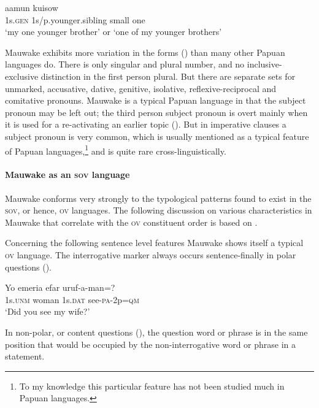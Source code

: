 \ea%
\label{ex:1:x660}
\gll {}  aamun    kuisow \\
 1s.\textsc{gen}  1s/p.younger.sibling  small  one     \\
\glt`my one younger brother' or `one of my younger brothers'
\z


Mauwake exhibits more variation in the  forms () than many other Papuan languages do.  There is only singular and plural number, and no inclusive-exclusive distinction in the first person plural.  But there are separate sets for unmarked, accusative, dative, genitive, isolative, reflexive-reciprocal and comitative pronouns.  Mauwake is a typical Papuan language in that the subject pronoun may be left out; the third person subject pronoun is overt  mainly when it is used for a re-activating an earlier topic ().  But in imperative clauses a subject pronoun is very common, which is  usually mentioned as a typical feature of Papuan languages,\footnote{To my knowledge this particular feature has not been studied much in Papuan languages.}  and is quite rare cross-linguistically.

\paragraph{Mauwake as an \textsc{sov} language} \label{sec:1.4.2.2}
Mauwake conforms very strongly to the typological patterns found to exist in the \textsc{sov}, or hence, \textsc{ov} languages.  The following discussion on various characteristics in Mauwake that correlate with the \textsc{ov} constituent order is based on \citet{Dryer2007a}.

Concerning the following sentence level features Mauwake shows itself a typical \textsc{ov} language.  The interrogative marker   always occurs sentence-finally in polar questions ().

\ea%
\label{ex:1:x672}
\gll Yo  emeria  efar  uruf-a-man=? \\
1s.\textsc{unm} woman  1s.\textsc{dat}  see-\textsc{pa}-2p=\textsc{qm}     \\
\glt`Did you see my wife?'
\z


In non-polar, or content questions (), the question word or phrase is in the same position that would be occupied by the non-interrogative word or phrase in a statement.

